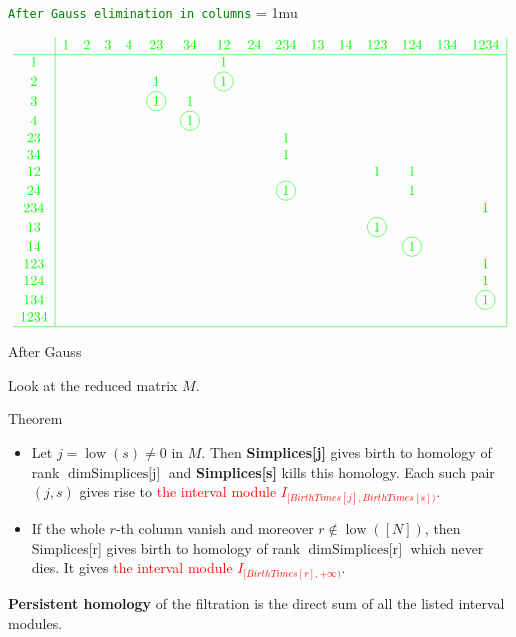 \documentclass[10pt,xcolor={usenames}]{beamer}
\newcommand*\circled[1]{\tikz[baseline=(char.base)]{
            \node[shape=circle,draw,inner sep=2pt] (char) {#1};}}
\DeclareMathOperator{\low}{low}
\begin{document}
{\begin{frame}{\textcolor{green}{\texttt{After Gauss elimination in columns}}}
\small
\setlength{\arraycolsep}{3pt}
\medmuskip = 1mu %

\[\color{green}
\begin{array}{c|ccccccccccccccc|}
& 1 & 2 & 3 & 4 & 23 & 34 & 12 & 24 & 234 & 13 & 14 & 123 & 124 & 134 & 1234\\
\hline
1   &&&&&&&1&&&&&&&& \\
2   &&&&&1&&\circled{1}&&&&&&&& \\
3   &&&&&\circled{1}&1&&&&&&&&& \\
4   &&&&&&\circled{1}&&&&&&&&& \\
23  &&&&&&&&&1&&&&&&\\
34  &&&&&&&&&1&&&&&& \\
12  &&&&&&&&&&&&1&1&& \\
24  &&&&&&&&&\circled{1}&&&&1&& \\
234 &&&&&&&&&&&&&&&1 \\
13  &&&&&&&&&&&&\circled{1}&&& \\
14  &&&&&&&&&&&&&\circled{1}&& \\
123 &&&&&&&&&&&&&&&1 \\
124 &&&&&&&&&&&&&&&1 \\
134 &&&&&&&&&&&&&&&\circled{1} \\
1234&&&&&&&&&&&&&&& \\
\hline
\end{array}
\]

\end{frame}
}

\begin{frame}{After Gauss}

Look at the reduced matrix $M$.

\begin{block}{Theorem}
\begin{itemize}
  \item Let $j=\low(s)\neq 0$ in $M$. Then \textbf{Simplices[j]} gives birth to homology of rank $\dim\mbox{Simplices[j]}$ and \textbf{Simplices[s]} kills this homology. Each such pair $(j,s)$ gives rise to \textcolor{red}{the interval module $I_{[BirthTimes[j],BirthTimes[s])}$}.
  \item If the whole $r$-th column vanish and moreover $r\notin\low([N])$, then Simplices[r] gives birth to homology of rank $\dim\mbox{Simplices[r]}$ which never dies. It gives \textcolor{red}{the interval module $I_{[BirthTimes[r],+\infty)}$}.
\end{itemize}
\textbf{Persistent homology} of the filtration is the direct sum of all the listed interval modules.
\end{block}

\end{frame}
\end{document}
